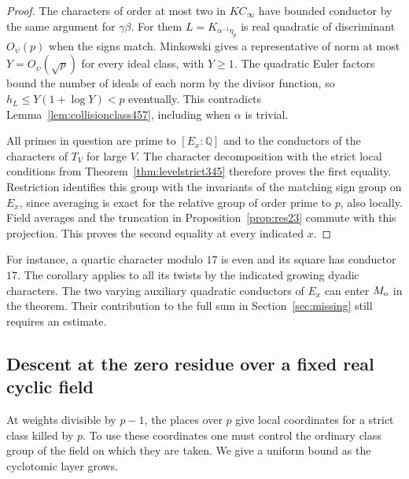 \documentclass[a4paper,11pt]{article}
\theoremstyle{definition}
\theoremstyle{remark}
\numberwithin{equation}{section}
\begin{document}
\begin{proof}
The characters of order at most two in \(K C_\infty\) have bounded
conductor by the same argument for \(\gamma\beta\). For them
\(L=K_{\alpha^{-1}\eta_p}\) is real quadratic of discriminant
\(O_\psi(p)\) when the signs match. Minkowski gives a representative
of norm at most \(Y=O_\psi(\sqrt p)\) for every ideal class, with
\(Y\ge1\). The quadratic Euler factors bound the number of ideals
of each norm by the divisor function, so \(h_L\le Y(1+\log Y)<p\)
eventually. This contradicts Lemma~\ref{lem:collisionclass457},
including when \(\alpha\) is trivial.

All primes in question are prime to \([E_x:\mathbb Q]\) and to the
conductors of the characters of \(T_V\) for large \(V\). The
character decomposition with the strict local conditions from
Theorem~\ref{thm:levelstrict345} therefore proves the first equality.
Restriction identifies this group with the invariants of the matching
sign group on \(E_x\), since averaging is exact for the relative
group of order prime to \(p\), also locally. Field averages and the
truncation in Proposition~\ref{prop:res23} commute with this
projection. This proves the second equality at every indicated \(x\).
\end{proof}

For instance, a quartic character modulo \(17\) is even and its square
has conductor \(17\). The corollary applies to all its twists by the
indicated growing dyadic characters. The two varying auxiliary
quadratic conductors of \(E_x\) can enter \(M_{\rm o}\) in the
theorem. Their contribution to the full sum in
Section~\ref{sec:missing} still requires an estimate.


\subsection{Descent at the zero residue over a fixed real cyclic field}
\label{sec:zerodescent634}

At weights divisible by \(p-1\), the places over \(p\) give local
coordinates for a strict class killed by \(p\). To use these coordinates
one must control the ordinary class group of the field on which they
are taken. We give a uniform bound as the cyclotomic layer grows.
\end{document}
